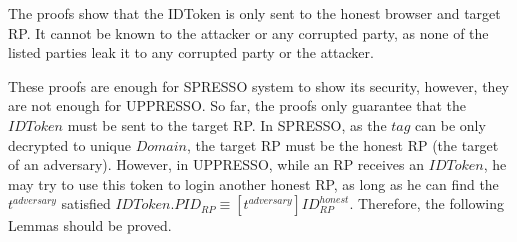 \documentclass[letterpaper,onecolumn,10pt]{article}
\begin{document}
The proofs show that the IDToken is only sent to the honest browser and target RP.
It cannot be known to the attacker or any corrupted party, as none of the listed 
parties leak it to any corrupted party or the attacker.

These proofs are enough for SPRESSO system to show its security, however, they are not enough for UPPRESSO.
So far, the proofs only guarantee that the $IDToken$ must be sent to the target RP.
In SPRESSO, as the $tag$ can be only decrypted to unique $Domain$, the target RP must be the honest RP (the target of an adversary).
However, in UPPRESSO, while an RP receives an $IDToken$, he may try to use this token to login another honest RP, as long as he can find the $t^{adversary}$ satisfied $IDToken.PID_{RP} \equiv [t^{adversary}]ID_{RP}^{honest}$.
Therefore, the following Lemmas should be proved.
\end{document}
